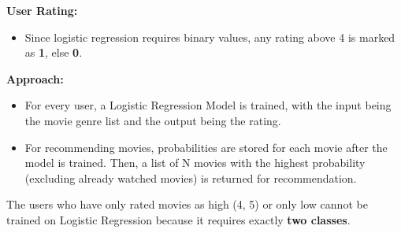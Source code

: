 \documentclass[a4paper]{article}
\theoremstyle{plain}
\theoremstyle{definition}
\begin{document}
        \textbf{User Rating:}
        \begin{itemize}
            \item Since logistic regression requires binary values, any rating above 4 is marked as \textbf{1}, else \textbf{0}.
        \end{itemize}
        
        \textbf{Approach:}
        \begin{itemize}
            \item For every user, a Logistic Regression Model is trained, with the input being the movie genre list and the output being the rating.
            \item For recommending movies, probabilities are stored for each movie after the model is trained. Then, a list of N movies with the highest probability (excluding already watched movies) is returned for recommendation.
        \end{itemize}
        
        The users who have only rated movies as high (4, 5) or only low cannot be trained on Logistic Regression because it requires exactly \textbf{two classes}.

    



\end{document}
